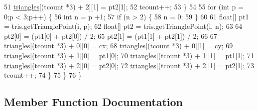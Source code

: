 \begin{DoxyCode}
51                 \mbox{\hyperlink{classorg_1_1newdawn_1_1slick_1_1geom_1_1_over_triangulator_a81f4d764fe0327ce4cd6692e777cc5f6}{triangles}}[(tcount *3) + 2][1] = pt2[1];
52                 tcount++;
53             \}
54             
55             \textcolor{keywordflow}{for} (\textcolor{keywordtype}{int} p = 0;p < 3;p++) \{
56                 \textcolor{keywordtype}{int} n = p +1;
57                 \textcolor{keywordflow}{if} (n > 2) \{
58                     n = 0;
59                 \}
60                 
61                 \textcolor{keywordtype}{float}[] pt1 = tris.getTrianglePoint(i, p);
62                 \textcolor{keywordtype}{float}[] pt2 = tris.getTrianglePoint(i, n);
63                 
64                 pt2[0] = (pt1[0] + pt2[0]) / 2;
65                 pt2[1] = (pt1[1] + pt2[1]) / 2;
66                 
67                 \mbox{\hyperlink{classorg_1_1newdawn_1_1slick_1_1geom_1_1_over_triangulator_a81f4d764fe0327ce4cd6692e777cc5f6}{triangles}}[(tcount *3) + 0][0] = cx;
68                 \mbox{\hyperlink{classorg_1_1newdawn_1_1slick_1_1geom_1_1_over_triangulator_a81f4d764fe0327ce4cd6692e777cc5f6}{triangles}}[(tcount *3) + 0][1] = cy;
69                 \mbox{\hyperlink{classorg_1_1newdawn_1_1slick_1_1geom_1_1_over_triangulator_a81f4d764fe0327ce4cd6692e777cc5f6}{triangles}}[(tcount *3) + 1][0] = pt1[0];
70                 \mbox{\hyperlink{classorg_1_1newdawn_1_1slick_1_1geom_1_1_over_triangulator_a81f4d764fe0327ce4cd6692e777cc5f6}{triangles}}[(tcount *3) + 1][1] = pt1[1];
71                 \mbox{\hyperlink{classorg_1_1newdawn_1_1slick_1_1geom_1_1_over_triangulator_a81f4d764fe0327ce4cd6692e777cc5f6}{triangles}}[(tcount *3) + 2][0] = pt2[0];
72                 \mbox{\hyperlink{classorg_1_1newdawn_1_1slick_1_1geom_1_1_over_triangulator_a81f4d764fe0327ce4cd6692e777cc5f6}{triangles}}[(tcount *3) + 2][1] = pt2[1];
73                 tcount++;
74             \}
75         \}
76     \}
\end{DoxyCode}


\subsection{Member Function Documentation}
\mbox{\label{classorg_1_1newdawn_1_1slick_1_1geom_1_1_over_triangulator_a6a17184e4004dd942f52d5b150369e86}} 
